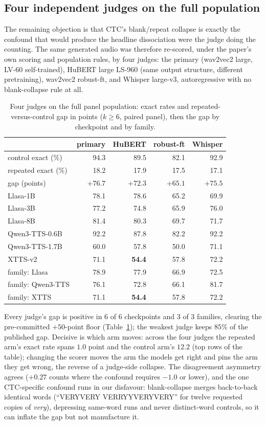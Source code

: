 \subsection{Four independent judges on the full population}\label{sec:judgefloor}
The remaining objection is that CTC's blank/repeat collapse is exactly the confound that would produce the headline
dissociation were the judge doing the counting. The same generated audio was therefore re-scored, under the paper's
own scoring and population rules, by four judges: the primary (wav2vec2 large, LV-60 self-trained), HuBERT large
LS-960 (same output structure, different pretraining), wav2vec2 robust-ft, and Whisper large-v3, autoregressive with
no blank-collapse rule at all.
\begin{table}[tp]
\centering
\caption{Four judges on the full panel population: exact rates and repeated-versus-control gap in points
($k\ge6$, paired panel), then the gap by checkpoint and by family.}
\label{tab:fourjudges}
\small
\begin{tabular}{lrrrr}
\toprule
 & primary & HuBERT & robust-ft & Whisper \\
\midrule
control exact (\%) & 94.3 & 89.5 & 82.1 & 92.9 \\
repeated exact (\%) & 18.2 & 17.9 & 17.5 & 17.1 \\
gap (points) & $+76.7$ & $+72.3$ & $+65.1$ & $+75.5$ \\
\midrule
Llasa-1B & 78.1 & 78.6 & 65.2 & 69.9 \\
Llasa-3B & 77.2 & 74.8 & 65.9 & 76.0 \\
Llasa-8B & 81.4 & 80.3 & 69.7 & 71.7 \\
Qwen3-TTS-0.6B & 92.2 & 87.8 & 82.2 & 92.2 \\
Qwen3-TTS-1.7B & 60.0 & 57.8 & 50.0 & 71.1 \\
XTTS-v2 & 71.1 & \textbf{54.4} & 57.8 & 72.2 \\
\midrule
family: Llasa & 78.9 & 77.9 & 66.9 & 72.5 \\
family: Qwen3-TTS & 76.1 & 72.8 & 66.1 & 81.7 \\
family: XTTS & 71.1 & \textbf{54.4} & 57.8 & 72.2 \\
\bottomrule
\end{tabular}
\end{table}

\noindent Every judge's gap is positive in $6$ of $6$ checkpoints and $3$ of $3$
families, clearing the pre-committed $+50$-point floor
(Table~\ref{tab:fourjudges}); the weakest judge keeps $85\%$ of the
published gap. Decisive is which arm moves: across the four judges the
repeated arm's exact rate spans $1.0$ point and the control arm's $12.2$
(top rows of the table); changing the scorer moves the arm the models get
right and pins the arm they get wrong, the reverse of a judge-side
collapse. The disagreement asymmetry agrees ($+0.27$ counts where the
confound requires $-1.0$ or lower), and the one CTC-specific confound runs
in our disfavour: blank-collapse merges back-to-back identical words
(``VERYVERY VERRYYVERYVERY'' for twelve requested copies of \emph{very}),
depressing same-word runs and never distinct-word controls, so it can
inflate the gap but not manufacture it.

